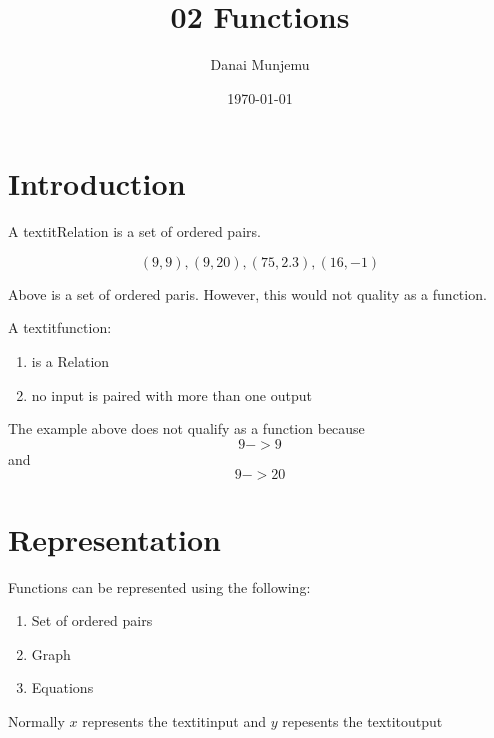 \documentclass{article}
\title{02 Functions}
\author{Danai Munjemu}
\date{\today}
\begin{document}
\maketitle %

\section{Introduction}
A textit{Relation} is a set of ordered pairs.

$${(9,9), (9, 20), (75, 2.3), (16, -1)}$$

Above is a set of ordered paris.
However, this would not quality as a function.

A textit{function}:
\begin{enumerate}
\item is a Relation
\item no input is paired with more than one output
\end{enumerate}

The example above does not qualify as a function because
$$9 -> 9$$ and $$9 -> 20$$

\section{Representation}
Functions can be represented using the following:
\begin{enumerate}
  \item Set of ordered pairs
  \item Graph
  \item Equations
\end{enumerate}

Normally $x$ represents the textit{input} and $y$ repesents the textit{output}
\end{document}
